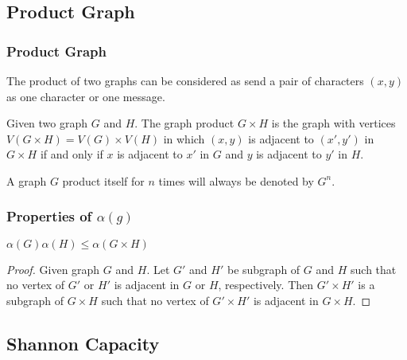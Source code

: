 \documentclass{beamer}
\begin{document}
            \subsection{Product Graph}

                  \begin{frame}
                        \frametitle{Product Graph}
                        \begin{definition}\label{def:graphProduct}
                              The product of two graphs can be considered as send a pair of characters $(x,y)$ as one character or one message.

                              \pause

                              Given two graph $ G $ and $ H $. The graph product $ G \times H $ is the graph with vertices $ V(G \times H) = V(G) \times V(H) $ in which $ (x,y) $ is adjacent to $ (x',y') $ in $ G \times H $ if and only if $ x $ is adjacent to $ x' $ in $ G $ and $ y $ is adjacent to $ y' $ in $ H $.
                  
                              \pause

                              A graph $ G $ product itself for $ n $ times will always be denoted by $ G^n $.
                        \end{definition}
                  \end{frame}

                  \begin{frame}
                        \frametitle{Properties of $\alpha(g)$}
                        \begin{lemma}
                              $\alpha(G)\alpha(H) \leq \alpha(G \times H)$
                        \end{lemma}

                        \pause

                        \begin{proof}
                              Given graph $ G $ and $ H $. Let $ G' $ and $ H' $ be subgraph of $ G $ and $ H $ such that no vertex of $ G' $ or $ H' $ is adjacent in $ G $ or $ H $, respectively. Then $ G' \times H' $ is a subgraph of $ G \times H $ such that no vertex of $ G' \times H' $ is adjacent in $ G \times H $.
                        \end{proof}
                  \end{frame}

            \subsection{Shannon Capacity}
\end{document}
